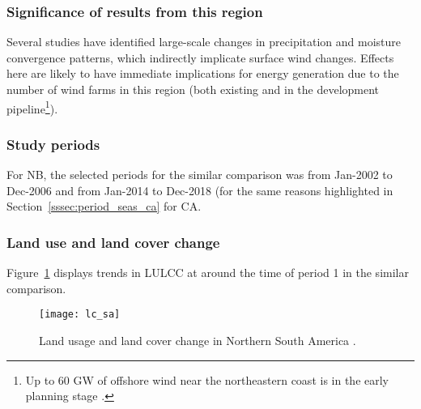 \subsubsection{Significance of results from this region}

Several studies have identified large-scale changes in precipitation and moisture convergence patterns, which indirectly implicate surface wind changes. Effects here are likely to have immediate implications for energy generation due to the number of wind farms in this region (both existing and in the development pipeline\footnote{Up to 60 GW of offshore wind near the northeastern coast is in the early planning stage \citep{offshore_map}.}).

\subsubsection{Study periods}

For \ac{NB}, the selected periods for the similar comparison was from Jan-2002 to Dec-2006 and from Jan-2014 to Dec-2018 (for the same reasons highlighted in Section~\ref{sssec:period_seas_ca} for \ac{CA}.

\subsubsection{Land use and land cover change}

Figure~\ref{fig:lc_sa} displays trends in \ac{LULCC} at around the time of period 1 in the similar comparison.

\begin{figure}[!ht]
	\centering
	\texttt{[image: lc\_sa]}
	\caption[Northern Brazil Land Usage]{Land usage and land cover change in Northern South America \citep{ipcc_2007}.}
	\label{fig:lc_sa}
\end{figure}